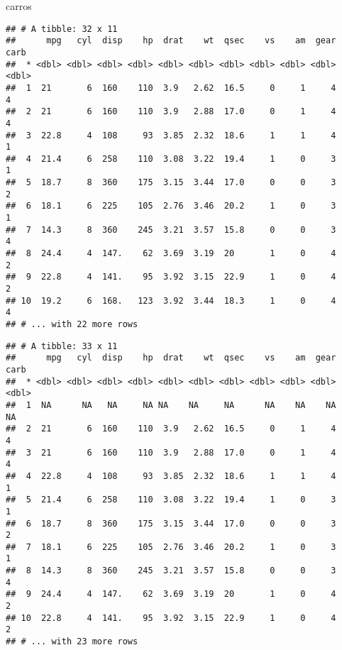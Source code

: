 \documentclass[]{book}
\newenvironment{Shaded}{\begin{snugshade}}{\end{snugshade}}
\newcommand{\DataTypeTok}[1]{\textcolor[rgb]{0.13,0.29,0.53}{#1}}
\newcommand{\DecValTok}[1]{\textcolor[rgb]{0.00,0.00,0.81}{#1}}
\newcommand{\KeywordTok}[1]{\textcolor[rgb]{0.13,0.29,0.53}{\textbf{#1}}}
\newcommand{\NormalTok}[1]{#1}
\newcommand{\OperatorTok}[1]{\textcolor[rgb]{0.81,0.36,0.00}{\textbf{#1}}}
\newcommand{\StringTok}[1]{\textcolor[rgb]{0.31,0.60,0.02}{#1}}
\begin{document}
\begin{Shaded}
\begin{Highlighting}[]
\NormalTok{carros}
\end{Highlighting}
\end{Shaded}

\begin{verbatim}
## # A tibble: 32 x 11
##      mpg   cyl  disp    hp  drat    wt  qsec    vs    am  gear  carb
##  * <dbl> <dbl> <dbl> <dbl> <dbl> <dbl> <dbl> <dbl> <dbl> <dbl> <dbl>
##  1  21       6  160    110  3.9   2.62  16.5     0     1     4     4
##  2  21       6  160    110  3.9   2.88  17.0     0     1     4     4
##  3  22.8     4  108     93  3.85  2.32  18.6     1     1     4     1
##  4  21.4     6  258    110  3.08  3.22  19.4     1     0     3     1
##  5  18.7     8  360    175  3.15  3.44  17.0     0     0     3     2
##  6  18.1     6  225    105  2.76  3.46  20.2     1     0     3     1
##  7  14.3     8  360    245  3.21  3.57  15.8     0     0     3     4
##  8  24.4     4  147.    62  3.69  3.19  20       1     0     4     2
##  9  22.8     4  141.    95  3.92  3.15  22.9     1     0     4     2
## 10  19.2     6  168.   123  3.92  3.44  18.3     1     0     4     4
## # ... with 22 more rows
\end{verbatim}

\begin{Shaded}
\end{Shaded}

\begin{verbatim}
## # A tibble: 33 x 11
##      mpg   cyl  disp    hp  drat    wt  qsec    vs    am  gear  carb
##  * <dbl> <dbl> <dbl> <dbl> <dbl> <dbl> <dbl> <dbl> <dbl> <dbl> <dbl>
##  1  NA      NA   NA     NA NA    NA     NA      NA    NA    NA    NA
##  2  21       6  160    110  3.9   2.62  16.5     0     1     4     4
##  3  21       6  160    110  3.9   2.88  17.0     0     1     4     4
##  4  22.8     4  108     93  3.85  2.32  18.6     1     1     4     1
##  5  21.4     6  258    110  3.08  3.22  19.4     1     0     3     1
##  6  18.7     8  360    175  3.15  3.44  17.0     0     0     3     2
##  7  18.1     6  225    105  2.76  3.46  20.2     1     0     3     1
##  8  14.3     8  360    245  3.21  3.57  15.8     0     0     3     4
##  9  24.4     4  147.    62  3.69  3.19  20       1     0     4     2
## 10  22.8     4  141.    95  3.92  3.15  22.9     1     0     4     2
## # ... with 23 more rows
\end{verbatim}
\end{document}
